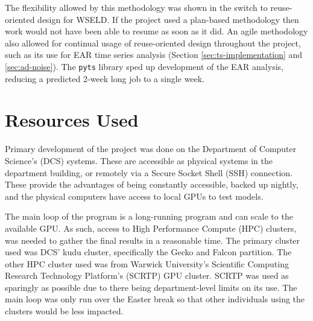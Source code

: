 The flexibility allowed by this methodology was shown in the switch to reuse-oriented design for WSELD. If the project used a plan-based methodology then work would not have been able to resume as soon as it did. An agile methodology also allowed for continual usage of reuse-oriented design throughout the project, such as its use for EAR time series analysis (Section \ref{sec:ts-implementation} and \ref{sec:ad-noise}). The \verb|pyts| library sped up development of the EAR analysis, reducing a predicted 2-week long job to a single week. 

\section{Resources Used}


Primary development of the project was done on the Department of Computer Science's (DCS) systems. These are accessible as physical systems in the department building, or remotely via a Secure Socket Shell (SSH) connection. These provide the advantages of being constantly accessible, backed up nightly, and the physical computers have access to local GPUs to test models.

The main loop of the program is a long-running program and can scale to the available GPU. As such, access to High Performance Compute (HPC) clusters, was needed to gather the final results in a reasonable time. The primary cluster used was DCS' kudu cluster, specifically the Gecko and Falcon partition. The other HPC cluster used was from Warwick University's Scientific Computing Research Technology Platform's (SCRTP) GPU cluster. SCRTP was used as sparingly as possible due to there being department-level limits on its use. The main loop was only run over the Easter break so that other individuals using the clusters would be less impacted.

